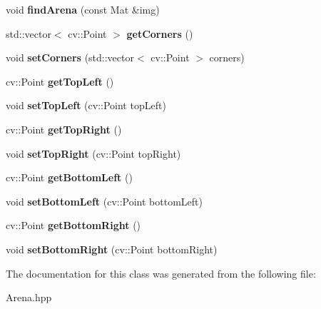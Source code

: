 \begin{DoxyCompactItemize}
\item 
\mbox{\label{class_arena_aa37acdf43108ab0da04b77bbf79c2f7d}} 
void {\bfseries find\+Arena} (const Mat \&img)
\item 
\mbox{\label{class_arena_a67171d93c7aff0f9d8bd3ee0596e9033}} 
std\+::vector$<$ cv\+::\+Point $>$ {\bfseries get\+Corners} ()
\item 
\mbox{\label{class_arena_a7f822f33ff5810d4d266183e7606c0fe}} 
void {\bfseries set\+Corners} (std\+::vector$<$ cv\+::\+Point $>$ corners)
\item 
\mbox{\label{class_arena_ae7219e6d298213627a0c671e5c5f9536}} 
cv\+::\+Point {\bfseries get\+Top\+Left} ()
\item 
\mbox{\label{class_arena_a7ab570cb7821df75c6da9af6491be034}} 
void {\bfseries set\+Top\+Left} (cv\+::\+Point top\+Left)
\item 
\mbox{\label{class_arena_aa417bc8757d66038038ac3f6a9d44860}} 
cv\+::\+Point {\bfseries get\+Top\+Right} ()
\item 
\mbox{\label{class_arena_a82c7fa04e8acf52f6edecc1ee1c38001}} 
void {\bfseries set\+Top\+Right} (cv\+::\+Point top\+Right)
\item 
\mbox{\label{class_arena_afdd88e341c385561eafbc73e90e08404}} 
cv\+::\+Point {\bfseries get\+Bottom\+Left} ()
\item 
\mbox{\label{class_arena_ac546db1983967fcc195369c8a0f1f9e5}} 
void {\bfseries set\+Bottom\+Left} (cv\+::\+Point bottom\+Left)
\item 
\mbox{\label{class_arena_ac62870a7bfa41baa7d38c4f7373cf3f5}} 
cv\+::\+Point {\bfseries get\+Bottom\+Right} ()
\item 
\mbox{\label{class_arena_a2207ae5feab0d9ef8a19ab46fdd8685c}} 
void {\bfseries set\+Bottom\+Right} (cv\+::\+Point bottom\+Right)
\end{DoxyCompactItemize}


The documentation for this class was generated from the following file\+:\begin{DoxyCompactItemize}
\item 
Arena.\+hpp\end{DoxyCompactItemize}
